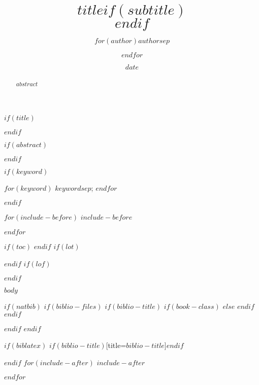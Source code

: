 \documentclass[$if(fontsize)$$fontsize$,$endif$$if(lang)$$lang$,$endif$$if(papersize)$$papersize$,$endif$$for(classoption)$$classoption$$sep$,$endfor$]{$documentclass$}
\title{$title$$if(subtitle)$\\\vspace{0.5em}{\large $subtitle$}$endif$}
\author{$for(author)$$author$$sep$ \and $endfor$}
\date{$date$}
\begin{document}
$if(title)$
\maketitle
$endif$

$if(abstract)$
\begin{abstract}
$abstract$
\end{abstract}
$endif$

$if(keyword)$
\begin{IEEEkeywords}
$for(keyword)$
    $keyword$$sep$;
$endfor$
\end{IEEEkeywords}
$endif$

$for(include-before)$
$include-before$

$endfor$

$if(toc)$
{
\hypersetup{linkcolor=black}
\setcounter{tocdepth}{$toc-depth$}
\tableofcontents
}
$endif$
$if(lot)$
\listoftables
$endif$
$if(lof)$
\listoffigures
$endif$

$body$

$if(natbib)$
$if(biblio-files)$
$if(biblio-title)$
$if(book-class)$
\renewcommand\bibname{$biblio-title$}
$else$
\renewcommand\refname{$biblio-title$}
$endif$
$endif$

$endif$
$endif$

$if(biblatex)$
\printbibliography$if(biblio-title)$[title=$biblio-title$]$endif$

$endif$
$for(include-after)$
$include-after$

$endfor$
\end{document}
